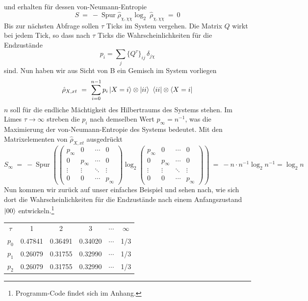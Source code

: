 \documentclass[12pt]{article}
\begin{document}
und erhalten für dessen von-Neumann-Entropie
\begin{equation}
S\ =\ -\operatorname{Spur} \hat{\rho}_{\chi,\chi\chi} \log_2\ \hat{\rho}_{\chi,\chi\chi}\ = \ 0
\end{equation}
Bis zur nächsten Abfrage sollen $\tau$ Ticks im System vergehen. Die Matrix $Q$ wirkt bei jedem Tick, so dass nach $\tau$ Ticks die Wahrscheinlichkeiten für die Endzustände
\begin{equation}
p_i=\sum_j \{Q^\tau\}_{ij}\, \delta_{j\chi}
\end{equation}
sind. Nun haben wir aus Sicht von B ein Gemisch im System vorliegen
\begin{equation}
\hat{\rho}_{X,xt}\ = \ \sum_{i=0}^{n-1} p_i \ket{X=i}\otimes\ket{ii}\ \bra{ii}\otimes\bra{X=i} 
\end{equation}
$n$ soll für die endliche Mächtigkeit des Hilbertraums des Systems stehen. Im Limes $\tau\rightarrow\infty$ streben die $p_i$ nach demselben Wert $p_\infty=n^{-1}$, was die Maximierung der von-Neumann-Entropie des Systems bedeutet. Mit den Matrixelementen von $\hat{\rho}_{X,xt}$ ausgedrückt
\begin{equation}
S_\infty\ =\ -\operatorname{Spur} \left(
\begin{pmatrix}
p_\infty&0&\cdots &0\\
0&p_\infty&\cdots &0\\
\vdots &\vdots &\ddots &\vdots \\
0&0&\cdots &p_\infty
\end{pmatrix}
\log_2
\begin{pmatrix}
p_\infty&0&\cdots &0\\
0&p_\infty&\cdots &0\\
\vdots &\vdots &\ddots &\vdots \\
0&0&\cdots &p_\infty
\end{pmatrix} \right)
\ =\ - n \cdot n^{-1} \log_2{n^{-1}} = \log_2{n}
\end{equation}
Nun kommen wir zurück auf unser einfaches Beispiel und sehen nach, wie sich dort die Wahrscheinlichkeiten für die Endzustände nach einem Anfangszustand $\ket{00}$ entwickeln.\footnote{Programm-Code findet sich im Anhang.}
\begin{center}
\begin{tabular}{ |c|c|c|c|c|c| } 
 \hline
 $\tau$ & 1 & 2 & 3 & $\cdots$ & $\infty$ \\ 
 $p_0$ & 0.47841 & 0.36491 & 0.34020 & $\cdots$ & 1/3 \\
 $p_1$ & 0.26079 & 0.31755 & 0.32990 & $\cdots$ & 1/3 \\
 $p_2$ & 0.26079 & 0.31755 & 0.32990 & $\cdots$ & 1/3 \\
 \hline
\end{tabular}
\end{center}
\end{document}
